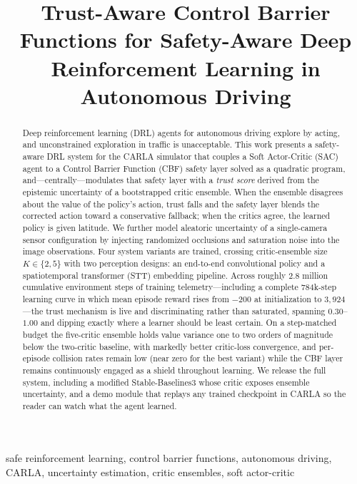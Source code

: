 \documentclass[conference]{IEEEtran}
\title{Trust-Aware Control Barrier Functions for Safety-Aware Deep Reinforcement Learning in Autonomous Driving}
\author{
\IEEEauthorblockN{Taiwo Victor}
\IEEEauthorblockA{
Kenya }
}
\begin{document}
\maketitle

\begin{abstract}
Deep reinforcement learning (DRL) agents for autonomous driving explore by acting, and unconstrained exploration in traffic is unacceptable. This work presents a safety-aware DRL system for the CARLA simulator that couples a Soft Actor-Critic (SAC) agent to a Control Barrier Function (CBF) safety layer solved as a quadratic program, and---centrally---modulates that safety layer with a \emph{trust score} derived from the epistemic uncertainty of a bootstrapped critic ensemble. When the ensemble disagrees about the value of the policy's action, trust falls and the safety layer blends the corrected action toward a conservative fallback; when the critics agree, the learned policy is given latitude. We further model aleatoric uncertainty of a single-camera sensor configuration by injecting randomized occlusions and saturation noise into the image observations. Four system variants are trained, crossing critic-ensemble size $K \in \{2, 5\}$ with two perception designs: an end-to-end convolutional policy and a spatiotemporal transformer (STT) embedding pipeline. Across roughly $2.8$ million cumulative environment steps of training telemetry---including a complete $784$k-step learning curve in which mean episode reward rises from $-200$ at initialization to $3{,}924$---the trust mechanism is live and discriminating rather than saturated, spanning $0.30$--$1.00$ and dipping exactly where a learner should be least certain. On a step-matched budget the five-critic ensemble holds value variance one to two orders of magnitude below the two-critic baseline, with markedly better critic-loss convergence, and per-episode collision rates remain low (near zero for the best variant) while the CBF layer remains continuously engaged as a shield throughout learning. We release the full system, including a modified Stable-Baselines3 whose critic exposes ensemble uncertainty, and a demo module that replays any trained checkpoint in CARLA so the reader can watch what the agent learned.
\end{abstract}

\begin{IEEEkeywords}
safe reinforcement learning, control barrier functions, autonomous driving, CARLA, uncertainty estimation, critic ensembles, soft actor-critic
\end{IEEEkeywords}
\end{document}
